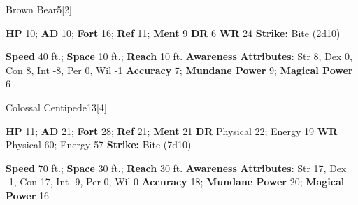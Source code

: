   
  \begin{monsection}{Brown Bear}{5}[2]
    \vspace{-1em}\vspace{-1em}
    \begin{spellcontent}
      \begin{spelltargetinginfo}
        \pari \textbf{HP} 10;
          \textbf{AD} 10;
          \textbf{Fort} 16;
          \textbf{Ref} 11;
          \textbf{Ment} 9
        \pari \textbf{DR} 6
        \pari \textbf{WR} 24
        \pari \textbf{Strike:}
            Bite  (2d10)
      \end{spelltargetinginfo}
    \end{spellcontent}
    \begin{monsterfooter}
      \pari \textbf{Speed} 40 ft.;
        \textbf{Space} 10 ft.;
        \textbf{Reach} 10 ft.
      \pari \textbf{Awareness} 
      \pari \textbf{Attributes}:
        Str 8, Dex 0, Con 8,
        Int -8, Per 0, Wil -1
      \pari \textbf{Accuracy} 7;
        \textbf{Mundane Power} 9;
      \textbf{Magical Power} 6
    \end{monsterfooter}
  \end{monsection}
  
  
  \begin{monsection}{Colossal Centipede}{13}[4]
    \vspace{-1em}\vspace{-1em}
    \begin{spellcontent}
      \begin{spelltargetinginfo}
        \pari \textbf{HP} 11;
          \textbf{AD} 21;
          \textbf{Fort} 28;
          \textbf{Ref} 21;
          \textbf{Ment} 21
        \pari \textbf{DR} Physical 22; Energy 19
        \pari \textbf{WR} Physical 60; Energy 57
        \pari \textbf{Strike:}
            Bite  (7d10)
      \end{spelltargetinginfo}
    \end{spellcontent}
    \begin{monsterfooter}
      \pari \textbf{Speed} 70 ft.;
        \textbf{Space} 30 ft.;
        \textbf{Reach} 30 ft.
      \pari \textbf{Awareness} 
      \pari \textbf{Attributes}:
        Str 17, Dex -1, Con 17,
        Int -9, Per 0, Wil 0
      \pari \textbf{Accuracy} 18;
        \textbf{Mundane Power} 20;
      \textbf{Magical Power} 16
    \end{monsterfooter}
  \end{monsection}
  
